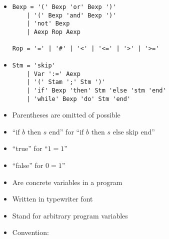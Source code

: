 \begin{itemize}
\begin{itemize}
\begin{itemize}
                \end{itemize}
                \begin{itemize}
                    \item
\begin{verbatim}
Bexp = '(' Bexp 'or' Bexp ')'
    | '(' Bexp 'and' Bexp ')'
    | 'not' Bexp
    | Aexp Rop Aexp

Rop = '=' | '#' | '<' | '<=' | '>' | '>='
\end{verbatim}
                \end{itemize}
                \begin{itemize}
                    \item
\begin{verbatim}
Stm = 'skip'
    | Var ':=' Aexp
    | '(' Stam ';' Stm ')'
    | 'if' Bexp 'then' Stm 'else 'stm 'end'
    | 'while' Bexp 'do' Stm 'end'
\end{verbatim}
                    \item Parentheses are omitted of possible
                \end{itemize}
                \begin{itemize}
                    \item ``$\text{if } b \text{ then } s \text{ end}$'' for ``$\text{if } b \text{ then } s \text{ else skip end}$''
                    \item ``true'' for ``$1=1$''
                    \item ``false'' for $0=1$''
                \end{itemize}
        \end{itemize}
        \begin{itemize}
                \begin{itemize}
                    \item Are concrete variables in a program
                    \item Written in typewriter font
                \end{itemize}
                \begin{itemize}
                    \item Stand for arbitrary program variables
                    \item Convention:
                        \begin{itemize}

\end{itemize}
\end{itemize}
\end{itemize}
\end{itemize}
